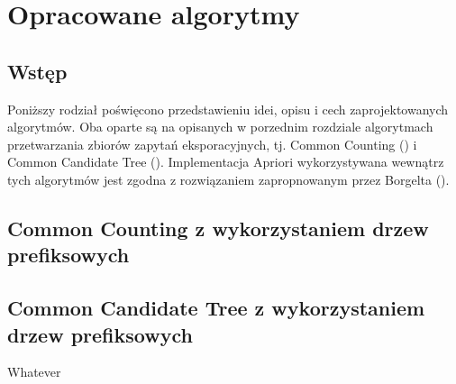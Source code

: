 \chapter{Opracowane algorytmy}
\label{c4}

\section{Wstęp}
\label{c41}
Poniższy rodział poświęcono przedstawieniu idei, opisu i cech zaprojektowanych algorytmów. Oba oparte są na opisanych w porzednim rozdziale algorytmach przetwarzania zbiorów zapytań eksporacyjnych, tj. Common Counting (\cite{WojciechowskiCC}) i Common Candidate Tree (\cite{WojciechowskiCCT}). Implementacja Apriori wykorzystywana wewnątrz tych algorytmów jest zgodna z rozwiązaniem zapropnowanym przez Borgelta (\cite{Borgelt}).

\section{Common Counting z wykorzystaniem drzew prefiksowych}
\label{c42}



\section{Common Candidate Tree z wykorzystaniem drzew prefiksowych}
\label{c43}

Whatever
